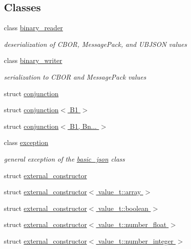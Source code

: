 \subsection*{Classes}
\begin{DoxyCompactItemize}
\item 
class \hyperlink{classnlohmann_1_1detail_1_1binary__reader}{binary\+\_\+reader}
\begin{DoxyCompactList}\small\item\em deserialization of C\+B\+OR, Message\+Pack, and U\+B\+J\+S\+ON values \end{DoxyCompactList}\item 
class \hyperlink{classnlohmann_1_1detail_1_1binary__writer}{binary\+\_\+writer}
\begin{DoxyCompactList}\small\item\em serialization to C\+B\+OR and Message\+Pack values \end{DoxyCompactList}\item 
struct \hyperlink{structnlohmann_1_1detail_1_1conjunction}{conjunction}
\item 
struct \hyperlink{structnlohmann_1_1detail_1_1conjunction_3_01_b1_01_4}{conjunction$<$ B1 $>$}
\item 
struct \hyperlink{structnlohmann_1_1detail_1_1conjunction_3_01_b1_00_01_bn_8_8_8_01_4}{conjunction$<$ B1, Bn... $>$}
\item 
class \hyperlink{classnlohmann_1_1detail_1_1exception}{exception}
\begin{DoxyCompactList}\small\item\em general exception of the \hyperlink{classnlohmann_1_1basic__json}{basic\+\_\+json} class \end{DoxyCompactList}\item 
struct \hyperlink{structnlohmann_1_1detail_1_1external__constructor}{external\+\_\+constructor}
\item 
struct \hyperlink{structnlohmann_1_1detail_1_1external__constructor_3_01value__t_1_1array_01_4}{external\+\_\+constructor$<$ value\+\_\+t\+::array $>$}
\item 
struct \hyperlink{structnlohmann_1_1detail_1_1external__constructor_3_01value__t_1_1boolean_01_4}{external\+\_\+constructor$<$ value\+\_\+t\+::boolean $>$}
\item 
struct \hyperlink{structnlohmann_1_1detail_1_1external__constructor_3_01value__t_1_1number__float_01_4}{external\+\_\+constructor$<$ value\+\_\+t\+::number\+\_\+float $>$}
\item 
struct \hyperlink{structnlohmann_1_1detail_1_1external__constructor_3_01value__t_1_1number__integer_01_4}{external\+\_\+constructor$<$ value\+\_\+t\+::number\+\_\+integer $>$}

\end{DoxyCompactItemize}
